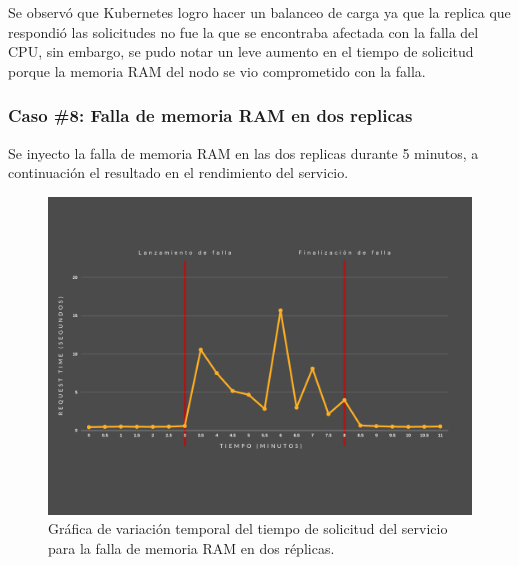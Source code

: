 \par Se observ\'o que Kubernetes logro hacer un balanceo de carga ya que la replica que respondió las solicitudes no fue la que se encontraba afectada con la falla del CPU, sin embargo, se pudo notar un leve aumento en el tiempo de solicitud porque la memoria RAM del nodo se vio comprometido con la falla.\\

\subsubsection{Caso \#8: Falla de memoria RAM en dos replicas}

\par Se inyecto la falla de memoria RAM en las dos replicas durante 5 minutos, a continuación el resultado en el rendimiento del servicio.\\

\begin{figure}[htpb!]
	\centering
	\includegraphics[width=0.95\columnwidth]{images/graficasexperimentos/RAM2.png}
	\caption{Gráfica de variación temporal del tiempo de solicitud del servicio para la falla de memoria RAM en dos r\'eplicas.}
	\label{fig:ram02}
\end{figure}


